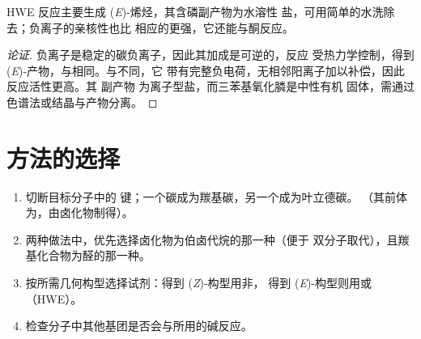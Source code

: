 \begin{proposition}\label{prop:b2:wittig:hwe}
HWE 反应主要生成 (\textit{E})-烯烃，其含磷副产物为水溶性
盐，可用简单的水洗除去；负离子的亲核性也比
相应的更强，它还能与酮反应。
\end{proposition}

\begin{proof}[论证]
负离子是稳定的碳负离子，因此其加成是可逆的，反应
受热力学控制，得到 (\textit{E})-产物，与相同。与不同，它
带有完整负电荷，无相邻阳离子加以补偿，因此反应活性更高。其
副产物  为离子型盐，而三苯基氧化膦是中性有机
固体，需通过色谱法或结晶与产物分离。
\end{proof}

\section{方法的选择}

\begin{method}[维蒂希切断]\label{met:b2:wittig:wittig-disconnection}
\begin{enumerate}
  \item 切断目标分子中的  键；一个碳成为羰基碳，另一个成为叶立德碳。
        （其前体为，由卤化物制得）。
  \item 两种做法中，优先选择卤化物为伯卤代烷的那一种（便于 
         双分子取代），且羰基化合物为醛的那一种。
  \item 按所需几何构型选择试剂：得到 (\textit{Z})-构型用非，
        得到 (\textit{E})-构型则用或（HWE）。
  \item 检查分子中其他基团是否会与所用的碱反应。
\end{enumerate}
\end{method}

